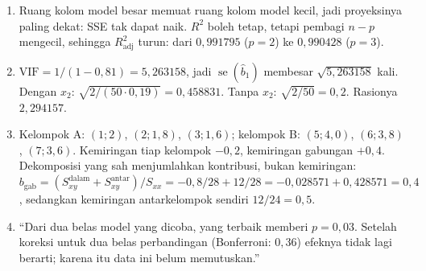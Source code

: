 \begin{enumerate}[label=\textbf{21.\arabic*}]
  \item Ruang kolom model besar memuat ruang kolom model kecil, jadi proyeksinya paling
        dekat: SSE tak dapat naik. $R^{2}$ boleh tetap, tetapi pembagi $n-p$ mengecil,
        sehingga $R^{2}_{\text{adj}}$ turun: dari $0{,}991795$ ($p=2$) ke
        $0{,}990428$ ($p=3$).

  \item $\mathrm{VIF}=1/(1-0{,}81)=5{,}263158$, jadi
        $\operatorname{se}(\hat b_{1})$ membesar $\sqrt{5{,}263158}$ kali. Dengan
        $x_{2}$: $\sqrt{2/(50\cdot0{,}19)}=0{,}458831$. Tanpa $x_{2}$:
        $\sqrt{2/50}=0{,}2$. Rasionya $2{,}294157$.

  \item 
Kelompok A: $(1;2)$, $(2;1{,}8)$, $(3;1{,}6)$; kelompok B: $(5;4{,}0)$,
        $(6;3{,}8)$, $(7;3{,}6)$. Kemiringan tiap kelompok $-0{,}2$, kemiringan
        gabungan $+0{,}4$. Dekomposisi yang sah menjumlahkan kontribusi, bukan
        kemiringan:
        $b_{\text{gab}}=(S_{xy}^{\text{dalam}}+S_{xy}^{\text{antar}})/S_{xx}=-0{,}8/28+12/28=-0{,}028571+0{,}428571=0{,}4$,
        sedangkan kemiringan antarkelompok sendiri $12/24=0{,}5$.

  \item ``Dari dua belas model yang dicoba, yang terbaik memberi $p=0{,}03$. Setelah
        koreksi untuk dua belas perbandingan (Bonferroni: $0{,}36$) efeknya tidak
        lagi berarti; karena itu data ini belum memutuskan.''
\end{enumerate}

